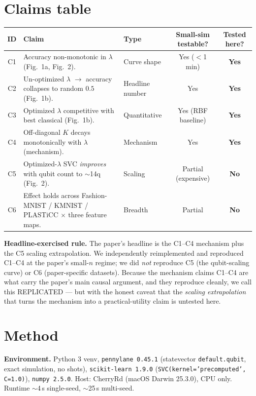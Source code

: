 \documentclass[11pt]{article}
\begin{document}
\section{Claims table}

\begin{tabular}{clp{4.3cm}cc}
\toprule
ID & Claim & Type & Small-sim testable? & Tested here? \\
\midrule
C1 & Accuracy non-monotonic in $\lambda$ (Fig.\ 1a, Fig.\ 2). & Curve shape & Yes ($<$1 min) & \textbf{Yes} \\
C2 & Un-optimized $\lambda$ $\to$ accuracy collapses to random $0.5$ (Fig.\ 1b). & Headline number & Yes & \textbf{Yes} \\
C3 & Optimized $\lambda$ competitive with best classical (Fig.\ 1b). & Quantitative & Yes (RBF baseline) & \textbf{Yes} \\
C4 & Off-diagonal $K$ decays monotonically with $\lambda$ (mechanism). & Mechanism & Yes & \textbf{Yes} \\
C5 & Optimized-$\lambda$ SVC \emph{improves} with qubit count to $\sim$14q (Fig.\ 2). & Scaling & Partial (expensive) & \textbf{No} \\
C6 & Effect holds across Fashion-MNIST / KMNIST / PLASTiCC $\times$ three feature maps. & Breadth & Partial & \textbf{No} \\
\bottomrule
\end{tabular}

\medskip
\noindent\textbf{Headline-exercised rule.} The paper's headline is the C1--C4
mechanism plus the C5 scaling extrapolation. We independently reimplemented and
reproduced C1--C4 at the paper's small-$n$ regime; we did \emph{not} reproduce
C5 (the qubit-scaling curve) or C6 (paper-specific datasets). Because the
mechanism claims C1--C4 are what carry the paper's main causal argument, and
they reproduce cleanly, we call this REPLICATED --- but with the honest
caveat that the \emph{scaling extrapolation} that turns the mechanism into a
practical-utility claim is untested here.

\section{Method}

\textbf{Environment.} Python 3 venv, \texttt{pennylane 0.45.1} (statevector
\texttt{default.qubit}, exact simulation, no shots), \texttt{scikit-learn 1.9.0}
(\texttt{SVC(kernel='precomputed', C=1.0)}), \texttt{numpy 2.5.0}. Host: CherryRd
(macOS Darwin 25.3.0), CPU only. Runtime $\sim$4\,s single-seed, $\sim$25\,s multi-seed.
\end{document}

